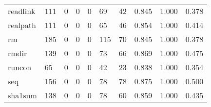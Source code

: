 \begin{longtable}{lp{1.3cm}p{1.3cm}p{1.3cm}p{1.3cm}p{1.3cm}p{1.3cm}p{1.3cm}p{1.3cm}p{1.3cm}}
readlink  &                    111 &                                             0 &                                            0 &                                           0 &                                           69 &                                         42 &                                0.845 &                                  1.000 &                                0.378 \\
realpath  &                    111 &                                             0 &                                            0 &                                           0 &                                           65 &                                         46 &                                0.854 &                                  1.000 &                                0.414 \\
rm        &                    185 &                                             0 &                                            0 &                                           0 &                                          115 &                                         70 &                                0.845 &                                  1.000 &                                0.378 \\
rmdir     &                    139 &                                             0 &                                            0 &                                           0 &                                           73 &                                         66 &                                0.869 &                                  1.000 &                                0.475 \\
runcon    &                     65 &                                             0 &                                            0 &                                           0 &                                           42 &                                         23 &                                0.838 &                                  1.000 &                                0.354 \\
seq       &                    156 &                                             0 &                                            0 &                                           0 &                                           78 &                                         78 &                                0.875 &                                  1.000 &                                0.500 \\
sha1sum   &                    138 &                                             0 &                                            0 &                                           0 &                                           78 &                                         60 &                                0.859 &                                  1.000 &                                0.435 \\

\end{longtable}
